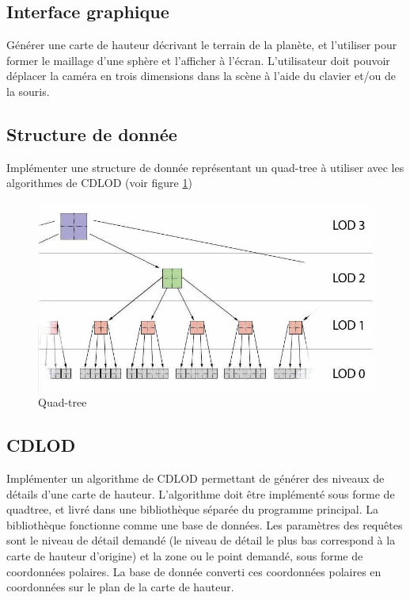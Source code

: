 \documentclass[12pt]{report}
\begin{document}
\subsection{Interface graphique}

Générer une carte de hauteur décrivant le terrain de la planète, et l'utiliser pour former le maillage d'une sphère et l'afficher à l'écran. L'utilisateur doit pouvoir déplacer la caméra en trois dimensions dans la scène à l'aide du clavier et/ou de la souris.

\subsection{Structure de donnée}

Implémenter une structure de donnée représentant un quad-tree à utiliser avec les algorithmes de CDLOD (voir figure \ref{fig:quadtree})

\begin{figure}[!ht]
  \includegraphics[scale=0.5]{img/Quadtree.png}
  \caption{Quad-tree}
  \label{fig:quadtree}
\end{figure}

\subsection{CDLOD}

Implémenter un algorithme de CDLOD permettant de générer des niveaux de détails d'une carte de hauteur. L'algorithme doit être implémenté sous forme de quadtree, et livré dans une bibliothèque séparée du programme principal. La bibliothèque fonctionne comme une base de données. Les paramètres des requêtes sont le niveau de détail demandé (le niveau de détail le plus bas correspond à la carte de hauteur d'origine) et la zone ou le point demandé, sous forme de coordonnées polaires. La base de donnée converti ces coordonnées polaires en coordonnées sur le plan de la carte de hauteur.
\end{document}
